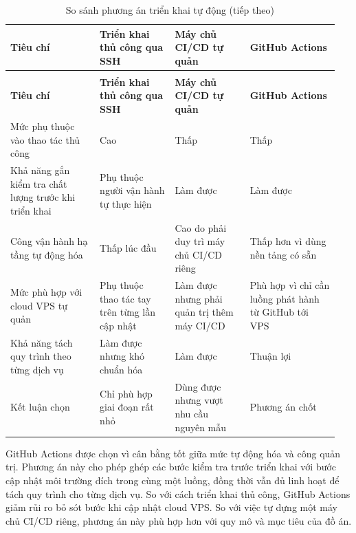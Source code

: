 \documentclass[a4paper]{extarticle}
\newcommand{\thesissettableid}[2]{%
  \renewcommand{\thetable}{#1}%
  \renewcommand{\theHtable}{#2}%
}
\begin{document}
{\thesissettableid{3.41}{condensed-bang-3-41-so-sanh-phuong-an-trien-khai-tu-dong}
\def\LTcaptype{table}
\begin{longtable}{|L{0.259\linewidth}|L{0.218\linewidth}|L{0.218\linewidth}|L{0.255\linewidth}|}
\caption{So sánh phương án triển khai tự động}\label{tab:condensed-bang-3-41-so-sanh-phuong-an-trien-khai-tu-dong}\\
\hline
\textbf{Tiêu chí} & \textbf{Triển khai thủ công qua SSH} & \textbf{Máy chủ CI/CD tự quản} & \textbf{GitHub Actions} \\
\hline
\endfirsthead
\caption[]{So sánh phương án triển khai tự động (tiếp theo)}\\
\hline
\textbf{Tiêu chí} & \textbf{Triển khai thủ công qua SSH} & \textbf{Máy chủ CI/CD tự quản} & \textbf{GitHub Actions} \\
\hline
\endhead
\endfoot
\endlastfoot
Mức phụ thuộc vào thao tác thủ công & Cao & Thấp & Thấp \\\hline
Khả năng gắn kiểm tra chất lượng trước khi triển khai & Phụ thuộc người vận hành tự thực hiện & Làm được & Làm được \\\hline
Công vận hành hạ tầng tự động hóa & Thấp lúc đầu & Cao do phải duy trì máy chủ CI/CD riêng & Thấp hơn vì dùng nền tảng có sẵn \\\hline
Mức phù hợp với cloud VPS tự quản & Phụ thuộc thao tác tay trên từng lần cập nhật & Làm được nhưng phải quản trị thêm máy CI/CD & Phù hợp vì chỉ cần luồng phát hành từ GitHub tới VPS \\\hline
Khả năng tách quy trình theo từng dịch vụ & Làm được nhưng khó chuẩn hóa & Làm được & Thuận lợi \\\hline
Kết luận chọn & Chỉ phù hợp giai đoạn rất nhỏ & Dùng được nhưng vượt nhu cầu nguyên mẫu & Phương án chốt \\\hline
\end{longtable}
}

GitHub Actions được chọn vì cân bằng tốt giữa mức tự động hóa và công quản trị.
Phương án này cho phép ghép các bước kiểm tra trước triển khai với bước cập nhật
môi trường đích trong cùng một luồng, đồng thời vẫn đủ linh hoạt để tách quy
trình cho từng dịch vụ.
So với cách triển khai thủ công, GitHub Actions giảm rủi ro bỏ sót bước khi cập
nhật cloud VPS. So với việc tự dựng một máy chủ CI/CD riêng, phương án này phù
hợp hơn với quy mô và mục tiêu của đồ án.
\end{document}

